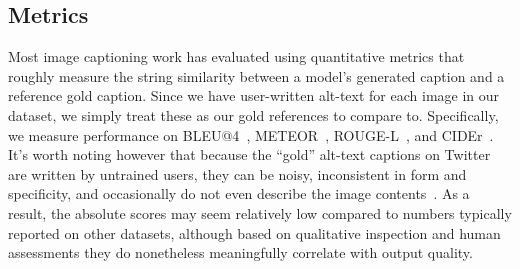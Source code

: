 \documentclass{article} %
\begin{document}
\subsection{Metrics}

Most image captioning work has evaluated using quantitative metrics that roughly measure the string similarity between a model's generated caption and a reference gold caption.
Since we have user-written alt-text for each image in our dataset, we simply treat these as our gold references to compare to.
Specifically, we measure performance on BLEU@4~\citep{bleu}, METEOR~\citep{meteor}, ROUGE-L~\citep{rouge}, and CIDEr~\citep{cider}.
It's worth noting however that because the ``gold'' alt-text captions on Twitter are written by untrained users, they can be noisy, inconsistent in form and specificity, and occasionally do not even describe the image contents~\citep{tryingtohideit}.
As a result, the absolute scores may seem relatively low compared to numbers typically reported on other datasets, although based on qualitative inspection and human assessments they do nonetheless meaningfully correlate with output quality.
\end{document}
